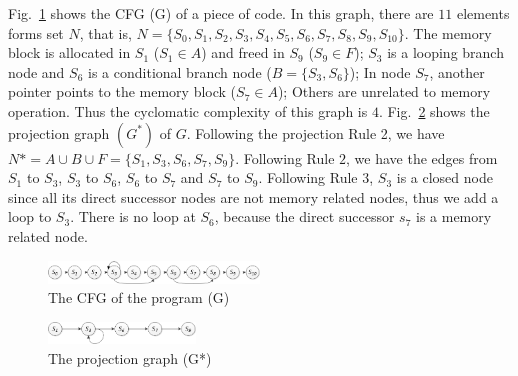 Fig.~\ref{figure3} shows the CFG (G) of a piece of code. In this graph, there are $11$ elements forms set $N$, that is, $N = \{S_0, S_1, S_2, S_3, S_4, S_5, S_6, S_7, S_8, S_9, S_{10}\}$. The memory block is allocated in $S_1$ ($S_1\in A$) and freed in $S_9$ ($S_9\in F$); $S_3$ is a looping branch node and $S_6$ is a conditional branch node ($B=\{S_3, S_6\}$); In node $S_7$, another pointer points to the memory block ($S_7\in A$); Others are unrelated to memory operation. Thus the cyclomatic complexity of this graph is $4$.
Fig.~\ref{fig:4} shows the projection graph $(G^*)$ of $G$. Following the projection Rule 2, we have $N*=A\cup B\cup F=\{S_1, S_3, S_6, S_7, S_9\}$. Following Rule $2$, we have the edges from $S_1$ to $S_3$, $S_3$ to $S_6$, $S_6$ to $S_7$ and $S_7$ to $S_9$. Following Rule $3$, $S_3$ is a closed node since all its direct successor nodes are not memory related nodes, thus we add a loop to $S_3$. There is no loop at $S_6$, because the direct successor $s_7$ is a memory related node.  

\begin{figure}[!h]
\center
\includegraphics[width=0.5\textwidth]{figure/fig1-fig4/fig_3}
\caption{The CFG of the program (G)}
\label{figure3}
\end{figure}

\begin{figure}[!h]
\center
\includegraphics[width=0.35\textwidth]{figure/fig1-fig4/fig_4}
\caption{The projection graph (G*)}
\label{fig:4}
\end{figure}

